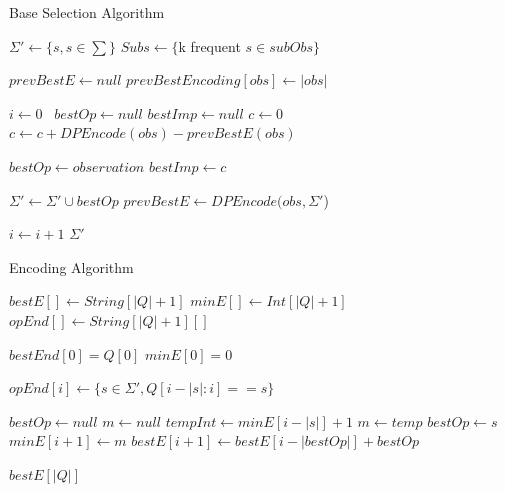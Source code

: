 \begin{algorithm}
\caption{Base Selection Algorithm}
\label{Base Selection}
\begin{algorithmic}[1]
\State $\Sigma' \gets \{s, s \in \sum \}$
\State $Subs \gets \{$k frequent $s \in subObs\}$

\State $prevBestE \gets null$
	\State $prevBestEncoding[obs] \gets |obs|$
\EndFor

\State $i \gets 0$\
	\State $bestOp \gets null$
	\State $bestImp \gets null$
		\State $c \gets 0$
			\State $c \gets c+DPEncode(obs)-prevBestE(obs)$
		\EndFor
		
			\State $bestOp \gets observation$
			\State $bestImp \gets c$
		\EndIf
		
	\EndFor

	\State $\Sigma' \gets \Sigma' \cup bestOp$
		\State $prevBestE \gets DPEncode(obs,\Sigma'$) 
	\EndFor	
	
	\State $i \gets i + 1$
\EndWhile 
\State \Return $\Sigma'$

\EndProcedure
\end{algorithmic}
\end{algorithm}

\begin{algorithm}
\caption{Encoding Algorithm}
\label{Encoding Algorithm}
\begin{algorithmic}[1]

\State $bestE[] \gets String[|Q|+1]$
\State $minE[] \gets Int[|Q|+1]$
\State $opEnd[] \gets String[|Q|+1][]$

\State $bestEnd[0] = Q[0]$
\State $minE[0] = 0$

	 \State $opEnd[i] \gets \{s \in \Sigma', Q[i-|s|:i] == s\}$
\EndFor

	\State $bestOp \gets null$
	\State $m \gets null$ 
		\State $tempInt \gets minE[i-|s|] + 1$
			\State $m \gets temp$ 
			\State $bestOp \gets s$
		\EndIf
	\EndFor
	\State $minE[i+1] \gets m$
	\State $bestE[i+1] \gets bestE[i-|bestOp|] + bestOp$
\EndFor

\State \Return $bestE[|Q|]$

\EndProcedure
\end{algorithmic}
\end{algorithm}





